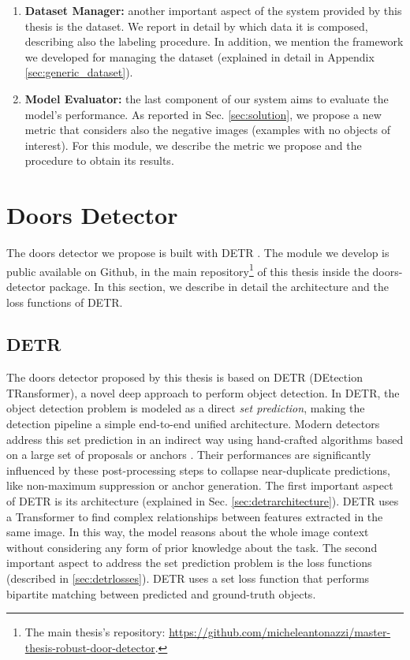 \begin{enumerate}
	\item \textbf{Dataset Manager:} another important aspect of the system provided by this thesis is the dataset. We report in detail by which data it is composed, describing also the labeling procedure. In addition, we mention the framework we developed for managing the dataset (explained in detail in Appendix \ref{sec:generic_dataset}).
	\item  \textbf{Model Evaluator:} the last component of our system aims to evaluate the model's performance. As reported in Sec. \ref{sec:solution}, we propose a new metric that considers also the negative images (examples with no objects of interest). For this module, we describe the metric we propose and the procedure to obtain its results.
\end{enumerate}


\section{Doors Detector}
\label{sec:doors_detector}

The doors detector we propose is built with DETR \cite{detr}. The module we develop is public available on Github, in the main repository\footnote{The main thesis's repository: \url{https://github.com/micheleantonazzi/master-thesis-robust-door-detector}.} of this thesis inside the \textsf{doors-detector} package. In this section, we describe in detail the architecture and the loss functions of DETR.

\subsection{DETR}
\label{sec:detr}
The doors detector proposed by this thesis is based on DETR \cite{detr} (DEtection TRansformer), a novel deep approach to perform object detection.  In DETR, the object detection problem is modeled as a direct \textit{set prediction}, making the detection pipeline a simple end-to-end unified architecture. Modern detectors address this set prediction in an indirect way using hand-crafted algorithms based on a large set of proposals \cite{yolo} or anchors \cite{focalloss}. Their performances are significantly influenced by these post-processing steps to collapse near-duplicate predictions, like non-maximum suppression or anchor generation. The first important aspect of DETR  is its architecture (explained in Sec. \ref{sec:detrarchitecture}). DETR uses a Transformer to find complex relationships between features extracted in the same image. In this way, the model reasons about the whole image context without considering any form of prior knowledge about the task. The second important aspect to address the set prediction problem is the loss functions (described in \ref{sec:detrlosses}). DETR uses a set loss function that performs bipartite matching between predicted and ground-truth objects.

